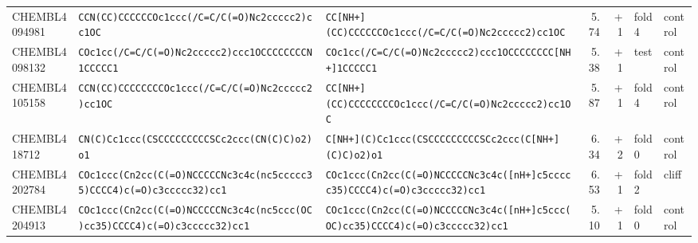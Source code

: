 \begin{longtable}{l p{4.4cm} p{4.4cm} r r l l}
CHEMBL4094981 & \texttt{CCN(\allowbreak{}CC)\allowbreak{}CCCCCCOc1ccc(\allowbreak{}/\allowbreak{}C=\allowbreak{}C/\allowbreak{}C(\allowbreak{}=\allowbreak{}O)\allowbreak{}Nc2ccccc2)\allowbreak{}cc1OC} & \texttt{CC[NH+]\allowbreak{}(\allowbreak{}CC)\allowbreak{}CCCCCCOc1ccc(\allowbreak{}/\allowbreak{}C=\allowbreak{}C/\allowbreak{}C(\allowbreak{}=\allowbreak{}O)\allowbreak{}Nc2ccccc2)\allowbreak{}cc1OC} & 5.74 & +1 & fold 4 & control \\
CHEMBL4098132 & \texttt{COc1cc(\allowbreak{}/\allowbreak{}C=\allowbreak{}C/\allowbreak{}C(\allowbreak{}=\allowbreak{}O)\allowbreak{}Nc2ccccc2)\allowbreak{}ccc1OCCCCCCCCN1CCCCC1} & \texttt{COc1cc(\allowbreak{}/\allowbreak{}C=\allowbreak{}C/\allowbreak{}C(\allowbreak{}=\allowbreak{}O)\allowbreak{}Nc2ccccc2)\allowbreak{}ccc1OCCCCCCCC[NH+]\allowbreak{}1CCCCC1} & 5.38 & +1 & test & control \\
CHEMBL4105158 & \texttt{CCN(\allowbreak{}CC)\allowbreak{}CCCCCCCCOc1ccc(\allowbreak{}/\allowbreak{}C=\allowbreak{}C/\allowbreak{}C(\allowbreak{}=\allowbreak{}O)\allowbreak{}Nc2ccccc2)\allowbreak{}cc1OC} & \texttt{CC[NH+]\allowbreak{}(\allowbreak{}CC)\allowbreak{}CCCCCCCCOc1ccc(\allowbreak{}/\allowbreak{}C=\allowbreak{}C/\allowbreak{}C(\allowbreak{}=\allowbreak{}O)\allowbreak{}Nc2ccccc2)\allowbreak{}cc1OC} & 5.87 & +1 & fold 4 & control \\
CHEMBL418712 & \texttt{CN(\allowbreak{}C)\allowbreak{}Cc1ccc(\allowbreak{}CSCCCCCCCCCSCc2ccc(\allowbreak{}CN(\allowbreak{}C)\allowbreak{}C)\allowbreak{}o2)\allowbreak{}o1} & \texttt{C[NH+]\allowbreak{}(\allowbreak{}C)\allowbreak{}Cc1ccc(\allowbreak{}CSCCCCCCCCCSCc2ccc(\allowbreak{}C[NH+]\allowbreak{}(\allowbreak{}C)\allowbreak{}C)\allowbreak{}o2)\allowbreak{}o1} & 6.34 & +2 & fold 0 & control \\
CHEMBL4202784 & \texttt{COc1ccc(\allowbreak{}Cn2cc(\allowbreak{}C(\allowbreak{}=\allowbreak{}O)\allowbreak{}NCCCCCNc3c4c(\allowbreak{}nc5ccccc35)\allowbreak{}CCCC4)\allowbreak{}c(\allowbreak{}=\allowbreak{}O)\allowbreak{}c3ccccc32)\allowbreak{}cc1} & \texttt{COc1ccc(\allowbreak{}Cn2cc(\allowbreak{}C(\allowbreak{}=\allowbreak{}O)\allowbreak{}NCCCCCNc3c4c(\allowbreak{}[nH+]\allowbreak{}c5ccccc35)\allowbreak{}CCCC4)\allowbreak{}c(\allowbreak{}=\allowbreak{}O)\allowbreak{}c3ccccc32)\allowbreak{}cc1} & 6.53 & +1 & fold 2 & cliff \\
CHEMBL4204913 & \texttt{COc1ccc(\allowbreak{}Cn2cc(\allowbreak{}C(\allowbreak{}=\allowbreak{}O)\allowbreak{}NCCCCCNc3c4c(\allowbreak{}nc5ccc(\allowbreak{}OC)\allowbreak{}cc35)\allowbreak{}CCCC4)\allowbreak{}c(\allowbreak{}=\allowbreak{}O)\allowbreak{}c3ccccc32)\allowbreak{}cc1} & \texttt{COc1ccc(\allowbreak{}Cn2cc(\allowbreak{}C(\allowbreak{}=\allowbreak{}O)\allowbreak{}NCCCCCNc3c4c(\allowbreak{}[nH+]\allowbreak{}c5ccc(\allowbreak{}OC)\allowbreak{}cc35)\allowbreak{}CCCC4)\allowbreak{}c(\allowbreak{}=\allowbreak{}O)\allowbreak{}c3ccccc32)\allowbreak{}cc1} & 5.10 & +1 & fold 0 & control \\

\end{longtable}
